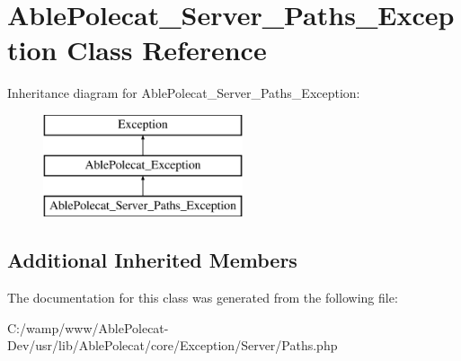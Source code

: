 \hypertarget{class_able_polecat___server___paths___exception}{}\section{Able\+Polecat\+\_\+\+Server\+\_\+\+Paths\+\_\+\+Exception Class Reference}
\label{class_able_polecat___server___paths___exception}
Inheritance diagram for Able\+Polecat\+\_\+\+Server\+\_\+\+Paths\+\_\+\+Exception\+:\begin{figure}[H]
\begin{center}
\leavevmode
\includegraphics[height=3.000000cm]{class_able_polecat___server___paths___exception}
\end{center}
\end{figure}
\subsection*{Additional Inherited Members}


The documentation for this class was generated from the following file\+:\begin{DoxyCompactItemize}
\item 
C\+:/wamp/www/\+Able\+Polecat-\/\+Dev/usr/lib/\+Able\+Polecat/core/\+Exception/\+Server/Paths.\+php\end{DoxyCompactItemize}
